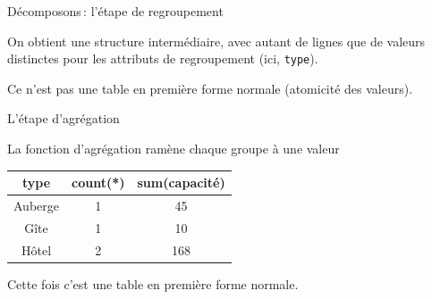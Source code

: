 \begin{frame}[fragile]{Décomposons\,: l'étape de regroupement}

On obtient une structure intermédiaire, avec autant de lignes que de valeurs
distinctes pour les attributs de regroupement (ici, \texttt{type}).

\vfill
{}
\vfill

\alert{Ce n'est pas une table en première forme normale (atomicité
des valeurs).}
\end{frame}

\begin{frame}[fragile]{L'étape d'agrégation}

La fonction d'agrégation ramène chaque groupe à une valeur
\vfill

\begin{tabular}{c|c|c}
\textbf{type} & \textbf{count(*)} & \textbf{sum(capacité)}\\ \hline 
Auberge & 1 & 45\\ \hline 
Gîte & 1 & 10\\ \hline 
Hôtel & 2 & 168\\ \hline 
\end{tabular}

\vfill
\alert{Cette fois c'est une table en première forme normale.}
\end{frame}


